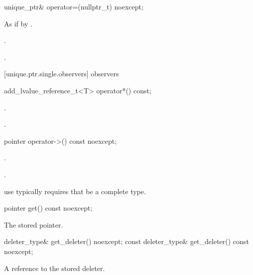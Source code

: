 %
\begin{itemdecl}
unique_ptr& operator=(nullptr_t) noexcept;
\end{itemdecl}

\begin{itemdescr}
\pnum
\effects As if by .

\pnum
\postcondition {}.

\pnum
\returns {}.
\end{itemdescr}

[unique.ptr.single.observers]{ observers}

%
\begin{itemdecl}
add_lvalue_reference_t<T> operator*() const;
\end{itemdecl}

\begin{itemdescr}
\pnum
\requires {}.

\pnum
\returns {}.

\end{itemdescr}

%
\begin{itemdecl}
pointer operator->() const noexcept;
\end{itemdecl}

\begin{itemdescr}
\pnum
\requires {}.

\pnum
\returns {}.

\pnum
\realnote use typically requires that  be a complete type.
\end{itemdescr}

%
\begin{itemdecl}
pointer get() const noexcept;
\end{itemdecl}

\begin{itemdescr}
\pnum
\returns The stored pointer.
\end{itemdescr}

%
\begin{itemdecl}
deleter_type& get_deleter() noexcept;
const deleter_type& get_deleter() const noexcept;
\end{itemdecl}

\begin{itemdescr}
\pnum
\returns A reference to the stored deleter.
\end{itemdescr}

